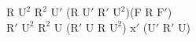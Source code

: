 R $\text{U}^2$ $\text{R}^2$ $\text{U}'$ (R $\text{U}'$ $\text{R}'$ $\text{U}^2$)(F R $\text{F}'$)\\
$\text{R}'$ $\text{U}^2$ $\text{R}^2$ U ($\text{R}'$ U R $\text{U}^2$) $\text{x}'$ ($\text{U}'$ $\text{R}'$ U)\\
